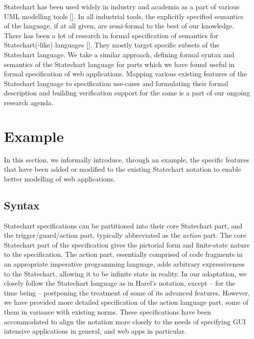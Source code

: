 \documentclass[12pt,a4paper]{report}
\begin{document}
Statechart has been used widely in industry and academia as a part of various UML modelling tools []. In all industrial tools, the explicitly specified semantics of the language, if at all given, are semi-formal to the best of our knowledge. There has been a lot of research in formal specification of semantics for Statechart(-like) languages []. They mostly target specific subsets of the Statechart language. We take a similar approach, defining formal syntax and semantics of the Statechart language for parts which we have found useful in formal specification of web applications. Mapping various existing features of the Statechart language to specification use-cases and formulating their formal description and building verification support for the same is a part of our ongoing research agenda.


\section{Example}
In this section, we informally introduce, through an example, the specific features that have been added or modified to the existing Statechart notation to enable better modelling of web applications.


\subsection{Syntax}
\begin{scriptsize}

\end{scriptsize}

Statechart specifications can be partitioned into their core Statechart part, and the trigger/guard/action part, typically abbreviated as the \emph{action} part. The core Statechart part of the specification gives the pictorial form and finite-state nature to the specification. The action part, essentially comprised of code fragments in an appropriate imperative programming language, adds arbitrary expressiveness to the Statechart, allowing it to be infinite state in reality. In our adaptation, we closely follow the Statechart language as in Harel's notation, except -- for the time being -- postponing the treatment of some of its advanced features. However, we have provided more detailed specification of the action language part, some of them in variance with existing norms. These specifications have been accommodated to align the notation more closely to the needs of specifying GUI intensive applications in general, and web apps in particular.
\end{document}
